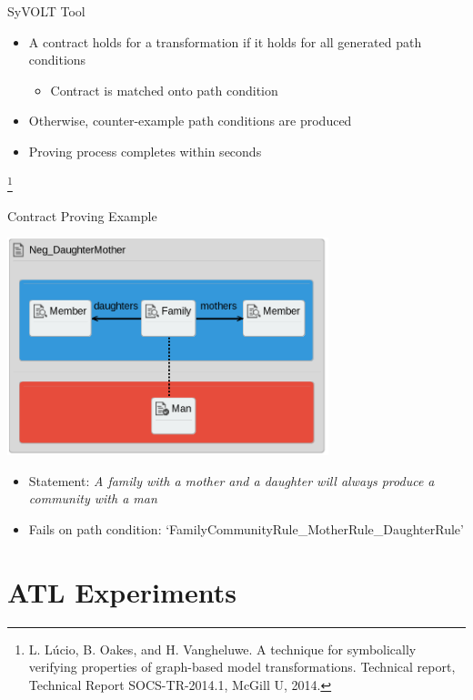 \documentclass[12pt, handout]{beamer}
\newcommand\blfootnote[1]{%
  \begingroup
  \renewcommand\thefootnote{}\footnote{#1}%
  \addtocounter{footnote}{-1}%
  \endgroup
}
\begin{document}
\begin{frame}{SyVOLT Tool}
\begin{itemize}[<+->]
\item A contract holds for a transformation if it holds for all generated path conditions
\begin{itemize}
\item Contract is matched onto path condition
\end{itemize}
\item Otherwise, counter-example path conditions are produced
\item Proving process completes within seconds
\end{itemize}
\blfootnote{L. Lúcio, B. Oakes, and H. Vangheluwe. A technique for symbolically verifying properties of graph-based model transformations. Technical report, Technical Report SOCS-TR-2014.1, McGill U, 2014.}
\end{frame}

\begin{frame}{Contract Proving Example}
\begin{center}
\includegraphics[width=0.7\textwidth]{figures/Pos_DaughterMother}
\end{center}
\begin{itemize}[<+->]
\item Statement: \textit{A family with a mother and a daughter will always produce a community with a man}
\item Fails on path condition: `FamilyCommunityRule\_MotherRule\_DaughterRule'
\end{itemize}
\end{frame}

\section{ATL Experiments}
\end{document}
